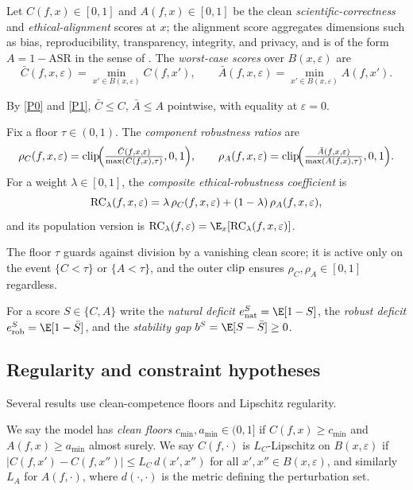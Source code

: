 \begin{definition}\label{def:scores}
Let $C(f,x)\in[0,1]$ and $A(f,x)\in[0,1]$ be the clean \emph{scientific-correctness}
and \emph{ethical-alignment} scores at $x$; the alignment score aggregates
dimensions such as bias, reproducibility, transparency, integrity, and privacy, and
is of the form $A=1-\mathrm{ASR}$ in the sense of \cite{Chao2024}. The
\emph{worst-case scores} over $B(x,\varepsilon)$ are
\[
  \bar C(f,x,\varepsilon)=\min_{x'\in B(x,\varepsilon)}C(f,x'),
  \qquad
  \bar A(f,x,\varepsilon)=\min_{x'\in B(x,\varepsilon)}A(f,x').
\]
\end{definition}

By \ref{P0} and \ref{P1}, $\bar C\le C$, $\bar A\le A$ pointwise, with equality at
$\varepsilon=0$.

\begin{definition}\label{def:rc}
Fix a floor $\tau\in(0,1)$. The \emph{component robustness ratios} are
\[
  \rho_C(f,x,\varepsilon)=\mathrm{clip}\!\Big(\tfrac{\bar C(f,x,\varepsilon)}{\max(C(f,x),\tau)},0,1\Big),
  \qquad
  \rho_A(f,x,\varepsilon)=\mathrm{clip}\!\Big(\tfrac{\bar A(f,x,\varepsilon)}{\max(A(f,x),\tau)},0,1\Big).
\]
For a weight $\lambda\in[0,1]$, the \emph{composite ethical-robustness coefficient}
is
\[
  \mathrm{RC}_\lambda(f,x,\varepsilon)=\lambda\,\rho_C(f,x,\varepsilon)+(1-\lambda)\,\rho_A(f,x,\varepsilon),
\]
and its population version is $\RC_\lambda(f,\varepsilon)=\E_x[\RC_\lambda(f,x,\varepsilon)]$.
\end{definition}

The floor $\tau$ guards against division by a vanishing clean score; it is active
only on the event $\{C<\tau\}$ or $\{A<\tau\}$, and the outer $\mathrm{clip}$ ensures
$\rho_C,\rho_A\in[0,1]$ regardless.

\begin{definition}\label{def:deficit}
For a score $S\in\{C,A\}$ write the \emph{natural deficit}
$e_\nat^S=\E[1-S]$, the \emph{robust deficit} $e_\rob^S=\E[1-\bar S]$, and the
\emph{stability gap} $b^S=\E[S-\bar S]\ge0$.
\end{definition}

\subsection{Regularity and constraint hypotheses}
Several results use clean-competence floors and Lipschitz regularity.

\begin{definition}\label{def:reg}
We say the model has \emph{clean floors} $c_{\min},a_{\min}\in(0,1]$ if
$C(f,x)\ge c_{\min}$ and $A(f,x)\ge a_{\min}$ almost surely. We say $C(f,\cdot)$ is
$L_C$-Lipschitz on $B(x,\varepsilon)$ if $|C(f,x')-C(f,x'')|\le L_C\,d(x',x'')$ for
all $x',x''\in B(x,\varepsilon)$, and similarly $L_A$ for $A(f,\cdot)$, where
$d(\cdot,\cdot)$ is the metric defining the perturbation set.
\end{definition}

